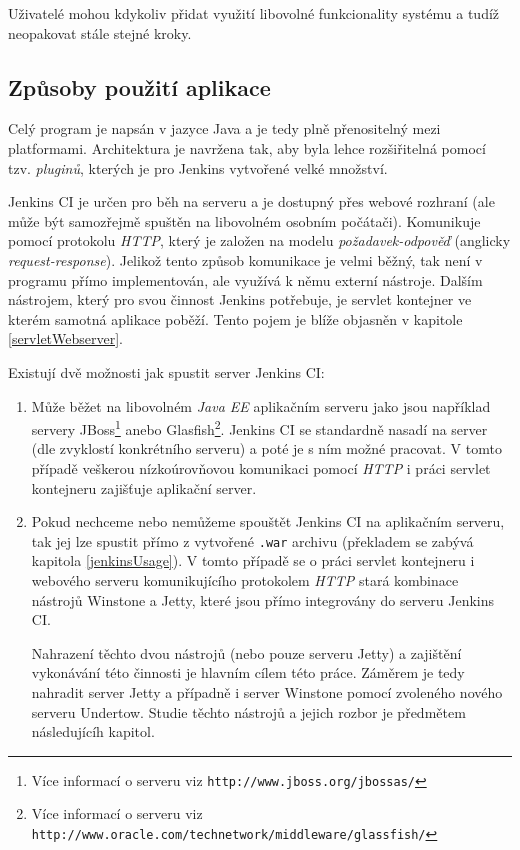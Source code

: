             Uživatelé mohou kdykoliv přidat využití libovolné funkcionality systému a tudíž neopakovat stále stejné kroky. 
            

        \subsection{Způsoby použití aplikace}
            Celý program je napsán v jazyce Java a je tedy plně přenositelný mezi platformami. Architektura je navržena tak, aby byla 
            lehce rozšiřitelná pomocí tzv. \emph{pluginů}, kterých je pro Jenkins vytvořené velké množství. 
            
            Jenkins CI je určen pro běh na serveru a je dostupný přes webové rozhraní (ale může být samozřejmě spuštěn
            na libovolném osobním počátači). Komunikuje pomocí protokolu \emph{HTTP}, 
            který je založen na modelu \emph{požadavek-odpověď} (anglicky \emph{request-response}). Jelikož tento způsob komunikace
            je velmi běžný, tak není v programu přímo implementován, ale využívá k němu externí nástroje. 
            Dalším nástrojem, který pro svou činnost Jenkins potřebuje, je servlet kontejner ve kterém samotná 
            aplikace poběží.
            Tento pojem je blíže objasněn v kapitole \ref{servletWebserver}.

            \medskip \noindent
            Existují dvě možnosti jak spustit server Jenkins CI:

            \begin{enumerate}
                \item{Může běžet na libovolném \emph{Java EE} aplikačním serveru \cite{jenkinsServers} jako jsou například servery 
                JBoss\footnote{Více informací o serveru viz \texttt{http://www.jboss.org/jbossas/}} 
                anebo Glasfish\footnote{Více informací o serveru viz \texttt{http://www.oracle.com/technetwork/middleware/glassfish/}}}.
                Jenkins CI se standardně nasadí na server (dle zvyklostí konkrétního serveru)
                a poté je s ním možné pracovat. V tomto případě veškerou nízkoúrovňovou komunikaci pomocí \emph{HTTP} 
                i práci servlet kontejneru zajišťuje aplikační server.
                
                \item{Pokud nechceme nebo nemůžeme spouštět Jenkins CI na aplikačním serveru, tak jej lze spustit přímo
                    z vytvořené \texttt{.war} archivu (překladem se zabývá kapitola \ref{jenkinsUsage}). V tomto případě
                    se o práci servlet kontejneru i webového serveru komunikujícího protokolem \emph{HTTP} stará 
                    kombinace nástrojů Winstone a Jetty, které jsou přímo integrovány do serveru Jenkins CI. 
                    
                    Nahrazení těchto dvou nástrojů (nebo pouze serveru Jetty) a zajištění vykonávání této činnosti je hlavním cílem této práce.
                    Záměrem je tedy nahradit server Jetty a případně i server Winstone pomocí zvoleného nového serveru Undertow.
                    Studie těchto nástrojů a jejich rozbor je předmětem následujícíh kapitol.}
            \end{enumerate}

